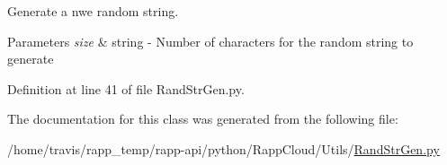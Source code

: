 Generate a nwe random string. 


\begin{DoxyParams}{Parameters}
{\em size} & string -\/ Number of characters for the random string to generate \\
\hline
\end{DoxyParams}


Definition at line 41 of file Rand\-Str\-Gen.\-py.



The documentation for this class was generated from the following file\-:\begin{DoxyCompactItemize}
\item 
/home/travis/rapp\-\_\-temp/rapp-\/api/python/\-Rapp\-Cloud/\-Utils/\hyperlink{RandStrGen_8py}{Rand\-Str\-Gen.\-py}\end{DoxyCompactItemize}
